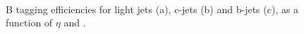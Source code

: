 \begin{figure}[!h]
\centering
{}
\\
\caption{B tagging efficiencies for light jets (a), c-jets (b) and
b-jets (c), as a function of $\eta$ and \pt.\label{fig:effmc}}
\end{figure}

